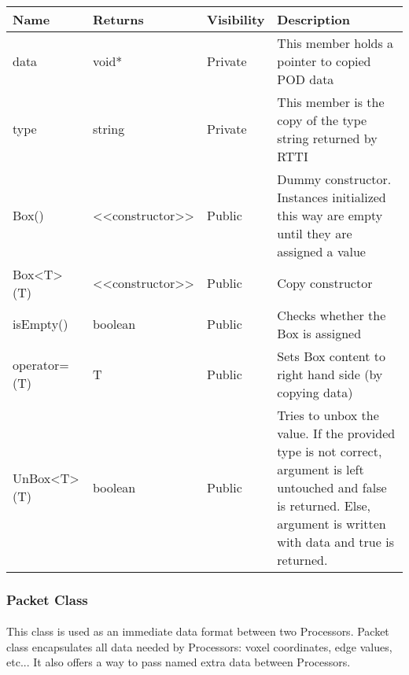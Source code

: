 \begin{center}
	\\[0.8cm]
	\begin{tabular}{|p{2.2cm}|p{2.2cm}|p{2cm}|p{7.6cm}|}
		\hline 
			Name & Returns & Visibility & Description \\
		\hline 
			data & void* & Private & This member holds a pointer to copied POD data \\
		\hline 
			type & string & Private & This member is the copy of the type string returned by RTTI \\
		\hline
			Box() & <<constructor>> & Public & Dummy constructor. Instances initialized this way are empty until they are assigned a value \\
		\hline
			Box<T>(T) & <<constructor>> & Public & Copy constructor \\
		\hline
			isEmpty() & boolean & Public & Checks whether the Box is assigned \\
		\hline
			operator=(T) & T & Public & Sets Box content to right hand side (by copying data) \\
		\hline
			UnBox<T>(T) & boolean & Public & Tries to unbox the value. If the provided type is not correct, argument is left untouched and false is returned. Else, argument is written with data and true is returned.\\
		\hline
	\end{tabular}
\end{center}

\skipsubsection

\subsubsection{Packet Class}
\paragraph{}
\normalsize
This class is used as an immediate data format between two Processors. Packet class encapsulates all data needed by Processors: voxel coordinates, edge values, etc... It also offers a way to pass named extra data between Processors.\\

